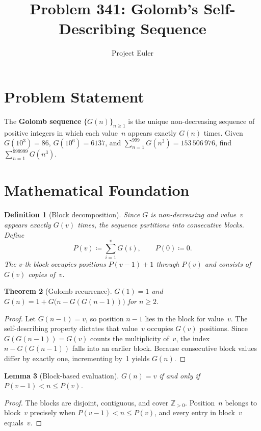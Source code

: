 \documentclass[a4paper,12pt]{article}
\title{Problem 341: Golomb's Self-Describing Sequence}
\author{Project Euler}
\date{}
\newtheorem{theorem}{Theorem}
\newtheorem{lemma}[theorem]{Lemma}
\newtheorem{definition}[theorem]{Definition}
\begin{document}
\maketitle

\section{Problem Statement}
The \textbf{Golomb sequence} $\{G(n)\}_{n \ge 1}$ is the unique non-decreasing sequence of positive integers in which each value~$n$ appears exactly $G(n)$ times. Given $G(10^3) = 86$, $G(10^6) = 6137$, and $\sum_{n=1}^{999} G(n^3) = 153\,506\,976$, find $\sum_{n=1}^{999999} G(n^3)$.

\section{Mathematical Foundation}

\begin{definition}[Block decomposition]
Since $G$ is non-decreasing and value~$v$ appears exactly $G(v)$ times, the sequence partitions into consecutive blocks. Define
\[
P(v) \coloneqq \sum_{i=1}^{v} G(i), \qquad P(0) \coloneqq 0.
\]
The $v$-th block occupies positions $P(v-1)+1$ through $P(v)$ and consists of $G(v)$ copies of~$v$.
\end{definition}

\begin{theorem}[Golomb recurrence]
$G(1) = 1$ and $G(n) = 1 + G\bigl(n - G(G(n-1))\bigr)$ for $n \ge 2$.
\end{theorem}

\begin{proof}
Let $G(n-1) = v$, so position $n-1$ lies in the block for value~$v$. The self-describing property dictates that value~$v$ occupies $G(v)$ positions. Since $G(G(n-1)) = G(v)$ counts the multiplicity of~$v$, the index $n - G(G(n-1))$ falls into an earlier block. Because consecutive block values differ by exactly one, incrementing by~1 yields $G(n)$.
\end{proof}

\begin{lemma}[Block-based evaluation]
$G(n) = v$ if and only if $P(v-1) < n \le P(v)$.
\end{lemma}

\begin{proof}
The blocks are disjoint, contiguous, and cover $\mathbb{Z}_{>0}$. Position~$n$ belongs to block~$v$ precisely when $P(v-1) < n \le P(v)$, and every entry in block~$v$ equals~$v$.
\end{proof}
\end{document}
